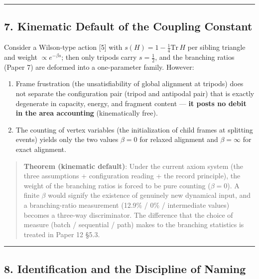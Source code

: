 \documentclass[
]{ltjsarticle}
\providecommand{\tightlist}{%
  \setlength{\itemsep}{0pt}\setlength{\parskip}{0pt}}
\begin{document}
\begin{center}\rule{0.5\linewidth}{0.5pt}\end{center}

\subsection{7. Kinematic Default of the Coupling
Constant}\label{kinematic-default-of-the-coupling-constant}

Consider a Wilson-type action {[}5{]} with
\(s(H)=1-\tfrac14\mathrm{Tr}\,H\) per sibling triangle and weight
\(\propto e^{-\beta s}\); then only tripods carry \(s=\tfrac12\), and
the branching ratios (Paper 7) are deformed into a one-parameter family.
However:

\begin{enumerate}
\def\labelenumi{\arabic{enumi}.}
\tightlist
\item
  Frame frustration (the unsatisfiability of global alignment at
  tripods) does not separate the configuration pair (tripod and
  antipodal pair) that is exactly degenerate in capacity, energy, and
  fragment content --- \textbf{it posts no debit in the area accounting}
  (kinematically free).
\item
  The counting of vertex variables (the initialization of child frames
  at splitting events) yields only the two values \(\beta=0\) for
  relaxed alignment and \(\beta=\infty\) for exact alignment.
\end{enumerate}

\begin{quote}
\textbf{Theorem (kinematic default)}: Under the current axiom system
(the three assumptions + configuration reading + the record principle),
the weight of the branching ratios is forced to be pure counting
(\(\beta=0\)). A finite \(\beta\) would signify the existence of
genuinely new dynamical input, and a branching-ratio measurement (12.9\%
/ 0\% / intermediate values) becomes a three-way discriminator. The
difference that the choice of measure (batch / sequential / path) makes
to the branching statistics is treated in Paper 12 §5.3.
\end{quote}

\begin{center}\rule{0.5\linewidth}{0.5pt}\end{center}

\subsection{8. Identification and the Discipline of
Naming}\label{identification-and-the-discipline-of-naming}
\end{document}
